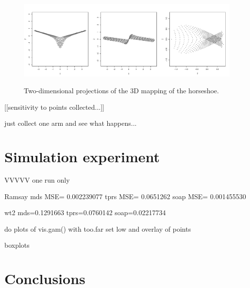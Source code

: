 \documentclass[a4paper,10pt]{amsart}
\begin{document}
\begin{figure}
\centering
\includegraphics[trim=0in 0.5in 0in 0.25in, width=5.5in]{figs/ramsay-mds-3d.pdf} \\
\caption{Two-dimensional projections of the 3D mapping of the horseshoe.}
\label{ramsay-mds-3d}
\end{figure}





[[sensitivity to points collected...]]

just collect one arm and see what happens...







\section{Simulation experiment}


VVVVV one run only

Ramsay
mds MSE= 0.002239077 
tprs MSE= 0.0651262 
soap MSE= 0.001455530 


wt2
mds=0.1291663
tprs=0.0760142
soap=0.02217734



do plots of vis.gam() with too.far set low and overlay of points

boxplots



\section{Conclusions}




\end{document}
